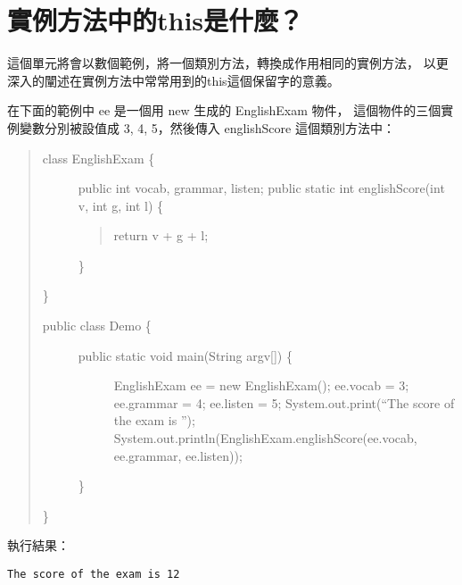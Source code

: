 \documentclass[a4paper,12pt,english]{sphinxmanual}
\begin{document}
\section{實例方法中的this是什麼？}
\label{java_object:this}
這個單元將會以數個範例，將一個類別方法，轉換成作用相同的實例方法，
以更深入的闡述在實例方法中常常用到的this這個保留字的意義。

在下面的範例中 ee 是一個用 new 生成的 EnglishExam 物件，
這個物件的三個實例變數分別被設值成 3, 4, 5，然後傳入 englishScore 這個類別方法中：
\begin{quote}
\begin{description}
\item[{class EnglishExam \{}] \leavevmode
public int vocab, grammar, listen;
public static int englishScore(int v, int g, int l) \{
\begin{quote}

return v + g + l;
\end{quote}

\}

\end{description}

\}
\begin{description}
\item[{public class Demo \{}] \leavevmode\begin{description}
\item[{public static void main(String argv{[}{]}) \{}] \leavevmode
EnglishExam ee = new EnglishExam();
ee.vocab = 3;
ee.grammar = 4;
ee.listen = 5;
System.out.print(``The score of the exam is '');
System.out.println(EnglishExam.englishScore(ee.vocab, ee.grammar, ee.listen));

\end{description}

\}

\end{description}

\}
\end{quote}

執行結果：

\begin{Verbatim}[commandchars=@\[\]]
The score of the exam is 12
\end{Verbatim}
\end{document}
